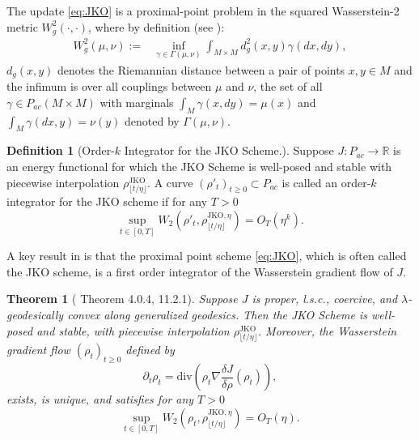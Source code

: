 \documentclass[reqno,11pt,letterpaper]{amsart}
\theoremstyle{plain}
\newtheorem{theorem}{Theorem}
\theoremstyle{definition}
\newtheorem{definition}{Definition}
\theoremstyle{remark}
\begin{document}
The update \eqref{eq:JKO} is a proximal-point problem in the squared Wasserstein-2 metric \cite{monge1781memoire, kantorovich1942english} $W_{g}^{2}(\cdot, \cdot)$, where by definition (see \cite{AGS2008}):
\begin{align*}
W_g^2(\mu, \nu):=&\inf_{\gamma \in \Gamma(\mu, \nu)}  \int_{M\times M} d_g^2(x,y) \gamma(dx,dy),
\end{align*}
$d_g(x,y)$ denotes the Riemannian distance between a pair of points $x,y \in M$ and the infimum is over all couplings between $\mu$ and $\nu$, the set of all $\gamma\in P_{ac}(M \times M)$ with marginals $\int_{M} \gamma(x,dy) = \mu(x)$ and $\int_{M} \gamma(dx,y) = \nu(y)$ denoted by $\Gamma(\mu, \nu)$.

\begin{definition}[Order-$k$ Integrator for the JKO Scheme.]\label{def:order_k_JKO}
    Suppose $J: P_{ac} \to \mathbb{R}$ is an energy functional for which the JKO Scheme is well-posed and stable with piecewise interpolation $\rho_{\lfloor t/\eta \rfloor}^{\mathrm{JKO}}$. A curve $(\rho'_t)_{t \geq 0} \subset P_{ac}$ is called an order-$k$ integrator for the JKO scheme if for any $T>0$
    \[
    \sup_{t\in [0,T]} W_2 (\rho'_t, \rho_{\lfloor t/\eta \rfloor}^{\mathrm{JKO}, \eta}) = O_T(\eta^{k}).
    \]
\end{definition}

A key result in \cite{AGS2008} is that the proximal point scheme \eqref{eq:JKO}, which is often called the JKO scheme, is a first order integrator of the Wasserstein gradient flow of $J$.

\begin{theorem}[\cite{AGS2008} Theorem 4.0.4, 11.2.1]\label{thrm:JKO_first_order}
    Suppose $J$ is proper, l.s.c., coercive, and $\lambda$-geodesically convex along generalized geodesics. Then the JKO Scheme is well-posed and stable, with piecewise interpolation $\rho_{\lfloor t/\eta \rfloor}^{\mathrm{JKO}}$. Moreover, the Wasserstein gradient flow $(\rho_{t})_{t \ge 0}$ defined by
    \[
    \partial_{t} \rho_{t} = \mathrm{div} \left(\rho_{t} \nabla \frac{\delta J}{\delta \rho} (\rho_{t}) \right),
    \]
    exists, is unique, and satisfies for any $T>0$
    \[
    \sup_{t\in [0,T]} W_2 (\rho_t, \rho_{\lfloor t/\eta \rfloor}^{\mathrm{JKO}, \eta}) = O_T(\eta).
    \]
\end{theorem}
\end{document}
